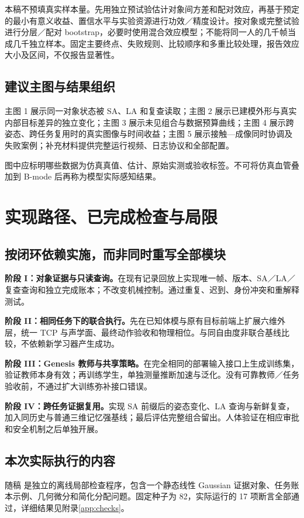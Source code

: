 \documentclass[UTF8,11pt,a4paper,fontset=fandol]{ctexart}
\numberwithin{equation}{section}
\theoremstyle{definition}
\newcommand{\code}[1]{\texttt{\detokenize{#1}}}
\begin{document}
本稿不预填真实样本量。先用独立预试验估计对象间方差和配对效应，再基于预定的最小有意义收益、置信水平与实验资源进行功效／精度设计。按对象或完整试验进行分层／配对 bootstrap，必要时使用混合效应模型；不能将同一人的几千帧当成几千独立样本。固定主要终点、失败规则、比较顺序和多重比较处理，报告效应大小及区间，不仅报告显著性。

\subsection{建议主图与结果组织}
主图 1 展示同一对象状态被 SA、LA 和复查读取；主图 2 展示已建模外形与真实内部目标差异的独立变化；主图 3 展示未见组合与数据预算曲线；主图 4 展示跨姿态、跨任务复用时的真实图像与时间收益；主图 5 展示接触—成像同时协调及失败案例；补充材料提供完整运行视频、日志协议和全部配置。

图中应标明哪些数据为仿真真值、估计、原始实测或验收标签。不可将仿真血管叠加到 B-mode 后再称为模型实际感知结果。

\section{实现路径、已完成检查与局限}
\label{sec:limits}
\subsection{按闭环依赖实施，而非同时重写全部模块}
\textbf{阶段 I：对象证据与只读查询。}在现有记录回放上实现唯一帧、版本、SA／LA／复查查询和独立完成账本；不改变机械控制。通过重复、迟到、身份冲突和重解释测试。

\textbf{阶段 II：相同任务下的联合执行。}先在已知体模与原有目标前端上扩展六维外层，统一 TCP 与声学面、最终动作验收和物理相位。与同自由度非联合基线比较，不依赖新学习器产生成功。

\textbf{阶段 III：Genesis 教师与共享策略。}在完全相同的部署输入接口上生成训练集，验证教师本身有效；再训练学生，单独测量推断加速与泛化。没有可靠教师／任务验收前，不通过扩大训练弥补接口错误。

\textbf{阶段 IV：跨任务证据复用。}实现 SA 前缀后的姿态变化、LA 查询与新鲜复查，加入同历史与普通三维记忆强基线；最后评估完整组合留出。人体验证在相应审批和安全机制之后单独开展。

\subsection{本次实际执行的内容}
随稿 \code{verify_v82.py} 是独立的离线局部检查程序，包含一个静态线性 Gaussian 证据对象、任务账本示例、几何微分和简化分配问题。固定种子为 82，实际运行的 17 项断言全部通过，详细结果见附录\ref{app:checks}。
\end{document}
